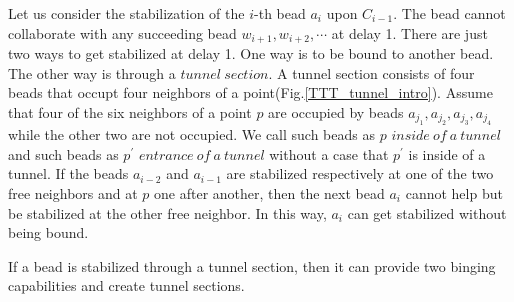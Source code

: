 \documentclass[a4,dvipdfmx,11pt]{article}
\theoremstyle{definition}
\begin{document}
Let us consider the stabilization of the $i$-th bead $a_i$ upon $C_{i-1}$. The bead cannot collaborate with any succeeding bead $w_{i+1},w_{i+2},\cdots$ at delay 1. There are just two ways to get stabilized at delay 1. One way is to be bound to another bead. The other way is through a $tunnel\ section$. A tunnel section consists of four beads that occupt four neighbors of a point(Fig.\ref{TTT_tunnel_intro}). Assume that four of the six neighbors of a point $p$ are occupied by beads $a_{j_1},a_{j_2},a_{j_3},a_{j_4}$ while the other two are not occupied. We call such beads as $p$ $inside\ of\ a\ tunnel$ and such beads as $p^\prime$ $entrance\ of\ a\ tunnel$ without a case that $p^\prime$ is inside of a tunnel. If the beads $a_{i-2}$ and $a_{i-1}$ are stabilized respectively at one of the two free neighbors and at $p$ one after another, then the next bead $a_i$ cannot help but be stabilized at the other free neighbor. In this way, $a_i$ can get stabilized without being bound.




If a bead is stabilized through a tunnel section, then it can provide two binging capabilities and create tunnel sections.
\end{document}
